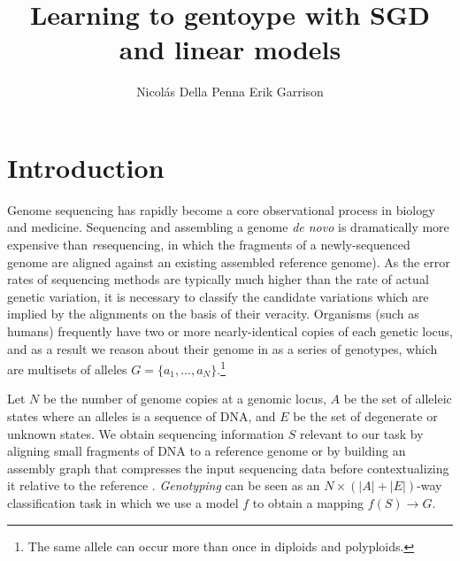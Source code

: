 \documentclass{article}
\title{Learning to gentoype with SGD and linear models}
\author{
Nicol\'as Della Penna
\And
Erik Garrison \\
} %
\begin{document}

\maketitle

\begin{abstract}

\end{abstract}

\section{Introduction}



Genome sequencing has rapidly become a core observational process in biology and medicine.
Sequencing and assembling a genome \emph{de novo} is dramatically more expensive than \emph{re}sequencing, in which the fragments of a newly-sequenced genome are aligned against an existing assembled reference genome).
As the error rates of sequencing methods are typically much higher than the rate of actual genetic variation, it is necessary to classify the candidate variations which are implied by the alignments on the basis of their veracity.
Organisms (such as humans) frequently have two or more nearly-identical copies of each genetic locus, and as a result we reason about their genome in as a series of genotypes, which are multisets of alleles $G = \{ a_1, \ldots, a_N \}$.\footnote{The same allele can occur more than once in diploids and polyploids.} 

Let $N$ be the number of genome copies at a genomic locus, $A$ be the set of alleleic states where an alleles is a sequence of DNA, and $E$ be the set of degenerate or unknown states.
We obtain sequencing information $S$ relevant to our task by aligning small fragments of DNA to a reference genome \cite{li2013bwamem} or by building an assembly graph that compresses the input sequencing data before contextualizing it relative to the reference \cite{myers2005, simpson2010, li2015fermikit, iqbal2012}.
\emph{Genotyping} can be seen as an $N \times ( |A| + |E| )$-way classification task in which we use a model $f$ to obtain a mapping $f(S) \to G$.

\end{document}
